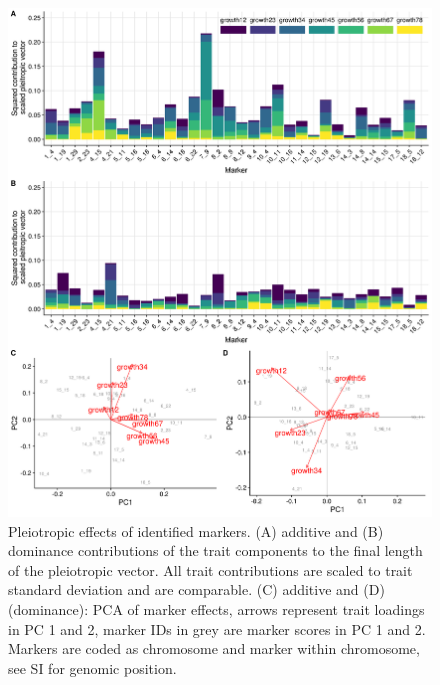 \begin{refsection}
\begin{figure}
\includegraphics[width=\linewidth]{chapter_JoH-Melo_etal/media/growth_pleiotropic_partition_ad_dm.png}
\caption[Pleiotropic effects of identified markers]{Pleiotropic effects of identified markers. (A) additive
and (B) dominance contributions of the trait components to the final
length of the pleiotropic vector. All trait contributions are scaled to
trait standard deviation and are comparable. (C) additive and (D)
(dominance): PCA of marker effects, arrows represent trait loadings in
PC 1 and 2, marker IDs in grey are marker scores in PC 1 and 2. Markers
are coded as chromosome and marker within chromosome, see SI for genomic
position.}
\label{fig:joh:pleiopart}
\end{figure}


\end{refsection}
